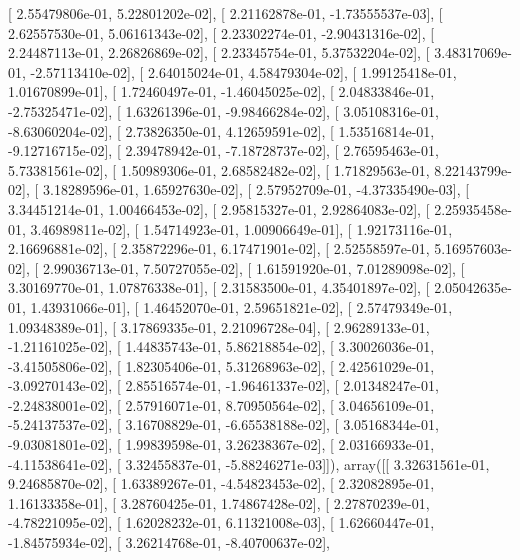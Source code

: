 \documentclass{article}
\begin{document}
       [  2.55479806e-01,   5.22801202e-02],
       [  2.21162878e-01,  -1.73555537e-03],
       [  2.62557530e-01,   5.06161343e-02],
       [  2.23302274e-01,  -2.90431316e-02],
       [  2.24487113e-01,   2.26826869e-02],
       [  2.23345754e-01,   5.37532204e-02],
       [  3.48317069e-01,  -2.57113410e-02],
       [  2.64015024e-01,   4.58479304e-02],
       [  1.99125418e-01,   1.01670899e-01],
       [  1.72460497e-01,  -1.46045025e-02],
       [  2.04833846e-01,  -2.75325471e-02],
       [  1.63261396e-01,  -9.98466284e-02],
       [  3.05108316e-01,  -8.63060204e-02],
       [  2.73826350e-01,   4.12659591e-02],
       [  1.53516814e-01,  -9.12716715e-02],
       [  2.39478942e-01,  -7.18728737e-02],
       [  2.76595463e-01,   5.73381561e-02],
       [  1.50989306e-01,   2.68582482e-02],
       [  1.71829563e-01,   8.22143799e-02],
       [  3.18289596e-01,   1.65927630e-02],
       [  2.57952709e-01,  -4.37335490e-03],
       [  3.34451214e-01,   1.00466453e-02],
       [  2.95815327e-01,   2.92864083e-02],
       [  2.25935458e-01,   3.46989811e-02],
       [  1.54714923e-01,   1.00906649e-01],
       [  1.92173116e-01,   2.16696881e-02],
       [  2.35872296e-01,   6.17471901e-02],
       [  2.52558597e-01,   5.16957603e-02],
       [  2.99036713e-01,   7.50727055e-02],
       [  1.61591920e-01,   7.01289098e-02],
       [  3.30169770e-01,   1.07876338e-01],
       [  2.31583500e-01,   4.35401897e-02],
       [  2.05042635e-01,   1.43931066e-01],
       [  1.46452070e-01,   2.59651821e-02],
       [  2.57479349e-01,   1.09348389e-01],
       [  3.17869335e-01,   2.21096728e-04],
       [  2.96289133e-01,  -1.21161025e-02],
       [  1.44835743e-01,   5.86218854e-02],
       [  3.30026036e-01,  -3.41505806e-02],
       [  1.82305406e-01,   5.31268963e-02],
       [  2.42561029e-01,  -3.09270143e-02],
       [  2.85516574e-01,  -1.96461337e-02],
       [  2.01348247e-01,  -2.24838001e-02],
       [  2.57916071e-01,   8.70950564e-02],
       [  3.04656109e-01,  -5.24137537e-02],
       [  3.16708829e-01,  -6.65538188e-02],
       [  3.05168344e-01,  -9.03081801e-02],
       [  1.99839598e-01,   3.26238367e-02],
       [  2.03166933e-01,  -4.11538641e-02],
       [  3.32455837e-01,  -5.88246271e-03]]), array([[  3.32631561e-01,   9.24685870e-02],
       [  1.63389267e-01,  -4.54823453e-02],
       [  2.32082895e-01,   1.16133358e-01],
       [  3.28760425e-01,   1.74867428e-02],
       [  2.27870239e-01,  -4.78221095e-02],
       [  1.62028232e-01,   6.11321008e-03],
       [  1.62660447e-01,  -1.84575934e-02],
       [  3.26214768e-01,  -8.40700637e-02],
\end{document}
